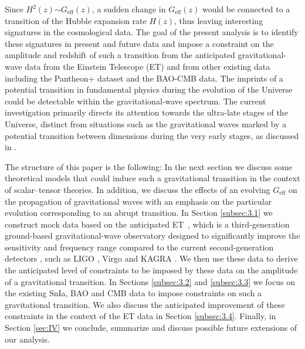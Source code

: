 \documentclass[universe,article,accept,moreauthors,pdftex]{Definitions/mdpi}
\begin{document}
 

Since $H^{2}(z)$$\sim$$G_{\text{eff}}(z)$, a sudden change in $G_{\text{eff}}(z)$ would be connected to a transition of the Hubble expansion rate $H(z)$, thus leaving interesting signatures in the cosmological data.  The goal of the present analysis is to identify these signatures in present and future data and impose a constraint on the amplitude and redshift of such a transition from the anticipated gravitational-wave data from the Einstein Telescope (ET) {\cite{Punturo:2010zz,Sathyaprakash:2012jk,Zhao_2011,Taylor:2012db,DAgostino:2019hvh,Belgacem_2018,Maggiore:2019uih,Branchesi:2023mws,Matos:2022uew}} and from other existing data including the Pantheon+ dataset and the BAO-CMB data. {The imprints of a potential transition in fundamental physics during the evolution of the Universe could be detectable within the gravitational-wave spectrum. The current investigation primarily directs its attention towards the ultra-late stages of the Universe, distinct from situations such as the gravitational waves marked by a potential transition between dimensions during the very early stages, as discussed in \cite{Mureika:2011bv}.}

The structure of this paper is the following: In the next section we discuss some theoretical models that could induce such a gravitational transition in the context of scalar--tensor theories. In addition, we discuss the effects of an evolving $G_{\text{eff}}$ on the propagation of gravitational waves with an emphasis on the particular evolution corresponding to an abrupt transition. In Section \ref{subsec:3.1} we construct mock data based on the anticipated \mbox{ET \cite{Zhao_2011,Taylor:2012db,Belgacem_2018,Punturo:2010zz}}, which 
is a third-generation ground-based gravitational-wave observatory designed to significantly improve the sensitivity and frequency range compared to the current second-generation detectors \cite{KAGRA:2013rdx}, such as LIGO \cite{LIGOScientific:2014pky}, Virgo \cite{VIRGO:2014yos} and KAGRA \cite{Aso:2013eba}. 
We then use these data to derive the anticipated level of constraints to be imposed by these data on the amplitude of a gravitational transition. In Sections \ref{subsec:3.2} and \ref{subsec:3.3} we focus on the existing SnIa, BAO and CMB data to impose constraints on such a gravitational transition. We also discuss the anticipated improvement of these constraints in the context of the ET data in Section \ref{subsec:3.4}. Finally, in Section \ref{sec:IV} we conclude, summarize and discuss possible future extensions of our analysis.
\end{document}
